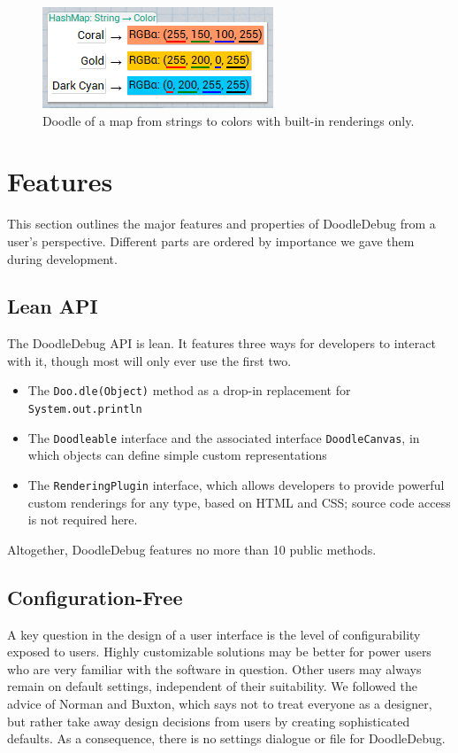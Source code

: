 \documentclass[english]{scrartcl}
\newcommand{\DD}{Dood\-le\-De\-bug\xspace}
\newcommand{\println}{\texttt{Sys\-tem.\-out.\-println}\xspace}
\begin{document}
\begin{figure}[h]
	\centering
	\includegraphics[width=0.5\linewidth]{img/Plugin_Map-Color.png}
	\caption{Doodle of a map from strings to colors with built-in renderings only.}
\end{figure}

\section{Features}
This section outlines the major features and properties of DoodleDebug from a user's perspective.
Different parts are ordered by importance we gave them during development.

\subsection{Lean API}
The \DD API is lean.
It features three ways for developers to interact with it, though most will only ever use the first two.
\begin{itemize}
\item The \texttt{Doo.dle(Object)} method as a drop-in replacement for \println
\item The \texttt{Doodleable} interface and the associated interface \texttt{DoodleCanvas}, in which objects can define simple custom representations
\item The \texttt{RenderingPlugin} interface, which allows developers to provide powerful custom renderings for any type, based on HTML and CSS; source code access is not required here.
\end{itemize}
Altogether, \DD features no more than 10 public methods.

\subsection{Configuration-Free}
A key question in the design of a user interface is the level of configurability exposed to users.
Highly customizable solutions may be better for power users who are very familiar with the software in question.
Other users may always remain on default settings, independent of their suitability.
We followed the advice of Norman\cite[p. 199-200]{Norm88a} and Buxton\cite[p. 102]{Buxt07a}, which says not to treat everyone as a designer, but rather take away design decisions from users by creating sophisticated defaults.
As a consequence, there is no settings dialogue or file for \DD.
\end{document}

